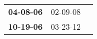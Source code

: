 \begin{supertabular}{p{0.33\columnwidth}p{0.33\columnwidth}p{0.33\columnwidth}}
 \textbf{04-08-06\textsuperscript{}} &  02-09-08\textsuperscript{} \\
 \textbf{10-19-06\textsuperscript{}} &  03-23-12\textsuperscript{} \\
\end{supertabular}
